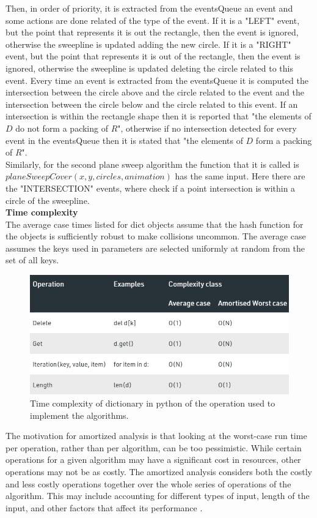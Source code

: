 \documentclass[12pt]{article}
\begin{document}
\noindent Then, in order of priority, it is extracted from the eventsQueue an event and some actions are done related of the type of the event. If it is a "LEFT" event, but the point that represents it is out the rectangle, then the event is ignored, otherwise the sweepline is updated adding the new circle. If it is a "RIGHT" event, but the point that represents it is out of the rectangle, then the event is ignored, otherwise the sweepline is updated deleting the circle related to this event. Every time an event is extracted from the eventsQueue it is computed the intersection between the circle above and the circle related to the event and the intersection between the circle below and the circle related to this event. If an intersection is within the rectangle shape then it is reported that "the elements of $D$ do not form a packing of $R$", otherwise if no intersection detected for every event in the eventsQueue then it is stated that "the elements of $D$ form a packing of $R$". \\

\noindent Similarly, for the second plane sweep algorithm the function that it is called is $planeSweepCover(x, y, circles, animation)$ has the same input. Here there are the "INTERSECTION" events, where check if a point intersection is within a circle of the sweepline. \\

\noindent \textbf{Time complexity}\\
The average case times listed for dict objects assume that the hash function for the objects is sufficiently robust to make collisions uncommon. The average case assumes the keys used in parameters are selected uniformly at random from the set of all keys. \cite{wiki:xx1}

\begin{figure}[H]
	\centering
	\includegraphics[scale=0.4]{img/2.png}
	\caption{Time complexity of dictionary in python of the operation used to implement the algorithms.} \label{fig:1b}
\end{figure}
\noindent The motivation for amortized analysis is that looking at the worst-case run time per operation, rather than per algorithm, can be too pessimistic. While certain operations for a given algorithm may have a significant cost in resources, other operations may not be as costly. The amortized analysis considers both the costly and less costly operations together over the whole series of operations of the algorithm. This may include accounting for different types of input, length of the input, and other factors that affect its performance \cite{wiki:xxx}. \\
\end{document}
